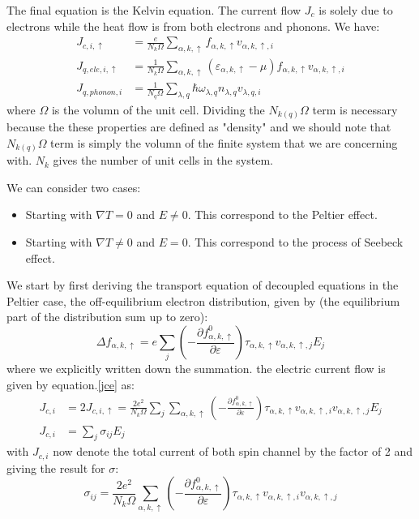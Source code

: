 \documentclass{article}
\newcommand{\pfrac}[2]{\frac{\partial #1}{\partial #2}}
\newcommand{\fak}{f_{\alpha,k,\uparrow}}
\newcommand{\ak}{\alpha,k,\uparrow}
\newcommand{\ql}{\lambda,q}
\begin{document}
The final equation is the Kelvin equation. The current flow $J_c$ is solely due to 
electrons while the heat flow is from both electrons and phonons. We have:
\begin{align}
    J_{c,i,\uparrow} &= \frac{e}{N_k\Omega}\sum_{\ak} f_{\ak} v_{\ak,i} \label{jce} \\
    J_{q,ele,i,\uparrow} &=  \frac{1}{N_k \Omega}\sum_{\ak} (\varepsilon_{\ak}-\mu) f_{\ak} v_{\ak,i} \label{jqe}\\
    J_{q,phonon,i} &= \frac{1}{N_q \Omega}\sum_{\ql} \hbar \omega_{\ql} n_{\ql} v_{\ql,i} \label{jqp}
\end{align}
where $\Omega$ is the volumn of the unit cell.
Dividing the $N_{k(q)}\Omega$ term is necessary because the these properties are defined as 
"density" and we should note that $N_{k(q)}\Omega$ term is simply the volumn of the 
finite system that we are concerning with. $N_k$ gives the number of unit cells in the 
system.

We can consider two cases:
\begin{itemize}
    \item Starting with $\nabla T =0$ and $E\neq 0 $. This correspond to the Peltier effect.
    \item Starting with $\nabla T \neq 0$ and $E= 0 $. This correspond to the process of 
           Seebeck effect.
\end{itemize}

We start by first deriving the transport equation of decoupled 
equations in the Peltier case, the off-equilibrium electron distribution,
given by (the equilibrium part of the distribution sum up to zero):
\begin{equation}
    \Delta \fak = e \sum_j \left(-\pfrac{\fak^0}{\varepsilon}\right) \tau_{\ak} v_{\ak,j} E_j
\end{equation} 
where we explicitly written down the summation.
the electric current flow is given by equation.\ref{jce} as:
\begin{align}
    J_{c,i} &= 2J_{c,i,\uparrow} = \frac{2e^2}{N_k \Omega} \sum_j \sum_{\ak} \left(-\pfrac{\fak^0}{\varepsilon}\right) \tau_{\ak} v_{\ak,i}v_{\ak,j} E_j \\
    J_{c,i} &= \sum_j \sigma_{ij} E_j
\end{align}
with $J_{c,i}$ now denote the total current of both spin channel by the 
factor of 2 and giving the result for $\sigma$:
\begin{equation}
    \sigma_{ij} = \frac{2e^2}{N_k \Omega} \sum_{\ak} \left(-\pfrac{\fak^0}{\varepsilon}\right) \tau_{\ak} v_{\ak,i}v_{\ak,j} \label{econd}
\end{equation}
\end{document}
